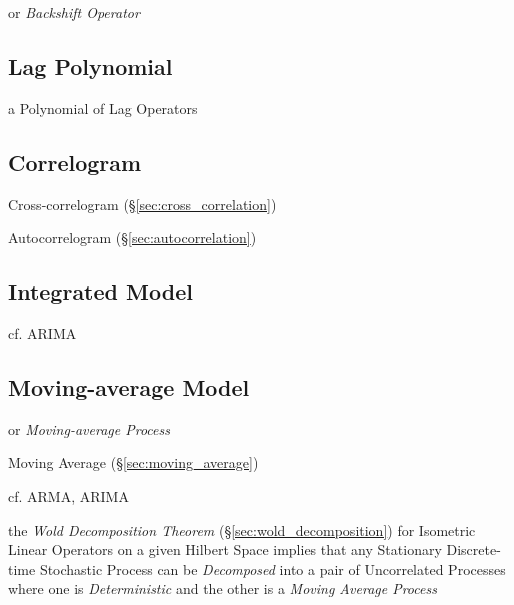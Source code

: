or \emph{Backshift Operator}



\subsection{Lag Polynomial}\label{sec:lag_polynomial}

a Polynomial of Lag Operators



\subsection{Correlogram}\label{sec:correlogram}

Cross-correlogram (\S\ref{sec:cross_correlation})

Autocorrelogram (\S\ref{sec:autocorrelation})



\subsection{Integrated Model}\label{sec:integrated_model}

cf. ARIMA



\subsection{Moving-average Model}\label{sec:moving_average_model}

or \emph{Moving-average Process}

Moving Average (\S\ref{sec:moving_average})

cf. ARMA, ARIMA

the \emph{Wold Decomposition Theorem} (\S\ref{sec:wold_decomposition}) for
Isometric Linear Operators on a given Hilbert Space implies that any Stationary
Discrete-time Stochastic Process can be \emph{Decomposed} into a pair of
Uncorrelated Processes where one is \emph{Deterministic} and the other is a
\emph{Moving Average Process}



